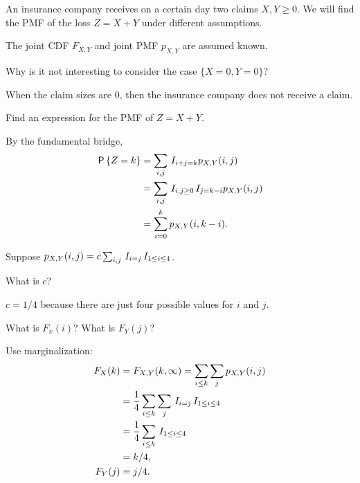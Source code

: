 An insurance company receives on a certain day two claims $X, Y \geq 0$.
We will find the PMF of the loss $Z=X+Y$ under different assumptions.

The joint CDF $F_{X,Y}$ and joint PMF $p_{X,Y}$ are assumed known.

\begin{exercise}
Why is it not interesting to consider the case $\{X=0, Y=0\}$?
\begin{solution}
When the claim sizes are $0$, then the insurance company does not receive a claim.
\end{solution}
\end{exercise}


\begin{exercise}
Find an expression for the PMF of $Z=X+Y$.
\begin{solution}
By the fundamental bridge,
\begin{align}
  \label{}
\,\mathsf{P}\left\{Z=k\right\}
&= \sum_{i,j} \,I_{i+j=k} p_{X,Y}(i,j) \\
&= \sum_{i,j} \,I_{i, j \geq 0} \,I_{j=k-i} p_{X,Y}(i,j) \\
&= \sum_{i=0}^{k} p_{X,Y}(i,k-i).
\end{align}
\end{solution}
\end{exercise}

Suppose $p_{X,Y}(i,j) = c \sum_{i,j} \,I_{i=j}\,I_{1\leq i \leq 4}$.


\begin{exercise}
What is $c$?
\begin{solution}
$c=1/4$ because there are just four possible values for $i$ and $j$.
\end{solution}
\end{exercise}

\begin{exercise}
What is $F_{x}(i)$?
What is $F_{Y}(j)$?
\begin{solution}
Use marginalization:
\begin{align}
F_X(k) &=  F_{X,Y}(k, \infty ) = \sum_{i\leq k} \sum_j p_{X,Y}(i,j) \\
 &= \frac{1}{4}\sum_{i\leq k} \sum_j \,I_{i=j}\,I_{1\leq i \leq 4}\\
 &= \frac{1}{4}\sum_{i\leq k} \,I_{1\leq i \leq 4} \\
&=k/4,\\
F_Y(j) &= j/4.
\end{align}
\end{solution}
\end{exercise}


